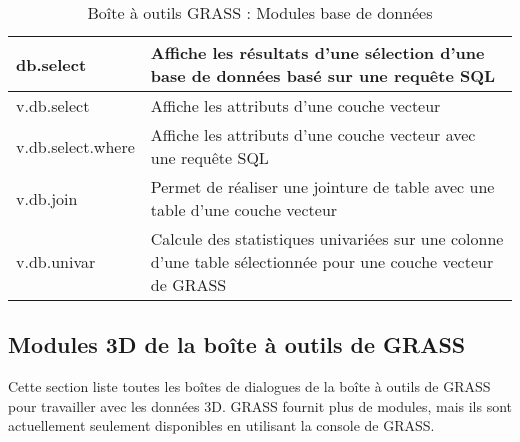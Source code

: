 \begin{table}[H]
\begin{tabular}{|p{4cm}|p{10cm}|}
  \hline db.select & Affiche les résultats d'une sélection d'une base de données basé sur une requ\^ete SQL\\
  \hline v.db.select & Affiche les attributs d'une couche vecteur\\
  \hline v.db.select.where & Affiche les attributs d'une couche vecteur avec une requ\^ete SQL\\
  \hline v.db.join & Permet de réaliser une jointure de table avec une table d'une couche vecteur\\
  \hline v.db.univar & Calcule des statistiques univariées sur une colonne d'une table sélectionnée pour une couche vecteur de GRASS\\
\hline
\end{tabular}
\caption{Boîte à outils GRASS : Modules base de données}
\end{table}

\newpage

\subsection{Modules 3D de la boîte à outils de GRASS}

Cette section liste toutes les boîtes de dialogues de la boîte à outils de GRASS pour travailler avec les données 3D. GRASS fournit plus de modules, mais ils sont actuellement seulement disponibles en utilisant la console de GRASS.

